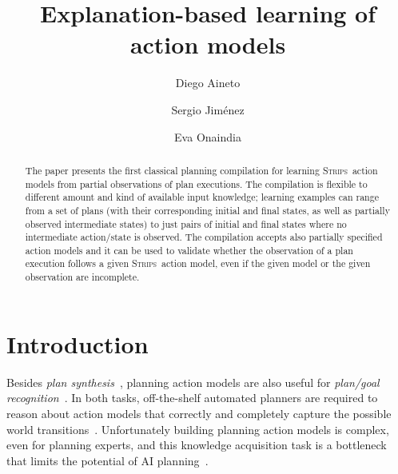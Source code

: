\documentclass[runningheads]{llncs}
\newcommand{\strips}{\textsc{Strips}}     %
\begin{document}
%
\title{Explanation-based learning of action models}
%
%
\author{Diego Aineto \and
Sergio Jim\'enez \and
Eva Onaindia}
%
%
%
\maketitle              %
%
\begin{abstract}
The paper presents the first classical planning compilation for learning \strips\ action models from partial observations of plan executions. The compilation is flexible to different amount and kind of available input knowledge; learning examples can range from a set of plans (with their corresponding initial and final states, as well as partially observed intermediate states) to just pairs of initial and final states where no intermediate action/state is observed. The compilation accepts also partially specified action models and it can be used to validate whether the observation of a plan execution follows a given \strips\ action model, even if the given model or the given observation are incomplete.
\end{abstract}



\section{Introduction}
Besides {\em plan synthesis}~\cite{ghallab2004automated}, planning action models are also useful for {\em plan/goal recognition}~\cite{ramirez2012plan}. In both tasks, off-the-shelf automated planners are required to reason about action models that correctly and completely capture the possible world transitions~\cite{geffner:book:2013}. Unfortunately building planning action models is complex, even for planning experts, and this knowledge acquisition task is a bottleneck that limits the potential of AI planning~\cite{kambhampati:modellite:AAAI2007}.
\end{document}

